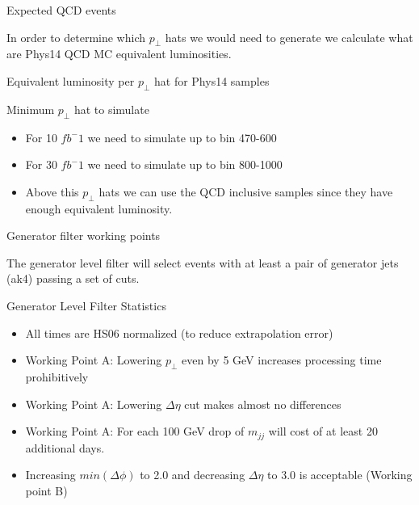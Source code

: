 \documentclass[8pt]{beamer}
\begin{document}
\begin{frame}{Expected QCD events}

In order to determine which $p_\perp$ hats we would need to generate we calculate what are Phys14 QCD MC equivalent luminosities.

\begin{block}{Equivalent luminosity per $p_\perp$ hat for Phys14 samples}



\end{block}

\begin{block}{Minimum $p_\perp$ hat to simulate}

\begin{itemize}
  \item For 10 $fb^-1$ we need to simulate up to bin 470-600
  \item For 30 $fb^-1$ we need to simulate up to bin 800-1000
  \item Above this $p_\perp$ hats we can use the QCD inclusive samples since they have enough equivalent luminosity.
\end{itemize}

\end{block}

\end{frame}

\begin{frame}{Generator filter working points}

The generator level filter will select events with at least a pair of generator jets (ak4) passing a set of cuts.

\begin{block}{Generator Level Filter Statistics}

  \centering
  
  
\end{block}

\begin{itemize}
  \item All times are HS06 normalized (to reduce extrapolation error)
  \item Working Point A: Lowering $p_\perp$ even by 5 GeV increases processing time prohibitively 
  \item Working Point A: Lowering $\Delta\eta$ cut makes almost no differences
  \item Working Point A: For each 100 GeV drop of $m_{jj}$ will cost of at least 20 additional days. 
  \item Increasing $min(\Delta\phi)$ to 2.0 and decreasing $\Delta\eta$ to 3.0 is acceptable (Working point B)
\end{itemize}
  
\end{frame}
\end{document}
